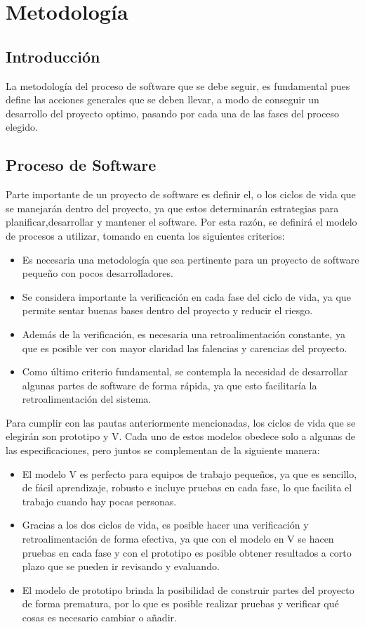 \chapter{Metodología}
\section{Introducción}
La metodología del proceso de software que se debe seguir, es fundamental pues define las acciones generales que se deben llevar, a modo de conseguir un desarrollo del proyecto optimo, pasando por cada una de las fases del proceso elegido.
\newpage

\section{Proceso de Software}
Parte importante de un proyecto de software es definir el, o los ciclos de vida que se manejarán dentro del proyecto, ya que estos determinarán estrategias para planificar,desarrollar y mantener el software. Por esta razón, se definirá el modelo de procesos a utilizar, tomando en cuenta los siguientes criterios:
\begin{itemize}
	\item Es necesaria una metodología que sea pertinente para un proyecto de software pequeño con pocos desarrolladores.
	\item Se considera importante la verificación en cada fase del ciclo de vida, ya que permite sentar buenas bases dentro del proyecto y reducir el riesgo.
	\item Además de la verificación, es necesaria una retroalimentación constante, ya que es posible ver con mayor claridad las falencias y carencias del proyecto.
	\item Como último criterio fundamental, se contempla la necesidad de desarrollar algunas partes de software de forma rápida, ya que esto facilitaría la retroalimentación del sistema.
\end{itemize}
Para cumplir con las pautas anteriormente mencionadas, los ciclos de vida que se elegirán son prototipo y V. Cada uno de estos modelos obedece solo a algunas de las especificaciones, pero juntos se complementan de la siguiente manera:
\begin{itemize}
	\item El modelo V es perfecto para equipos de trabajo pequeños, ya que es sencillo, de fácil aprendizaje, robusto e incluye pruebas en cada fase, lo que facilita el trabajo cuando hay pocas personas. 
	\item Gracias a los dos ciclos de vida, es posible hacer una verificación y retroalimentación de forma efectiva, ya que con el modelo en V se hacen pruebas en cada fase y con el prototipo es posible obtener resultados a corto plazo que se pueden ir revisando y evaluando.
	\item El modelo de prototipo brinda la posibilidad de construir partes del proyecto de forma prematura, por lo que es posible realizar pruebas y verificar qué cosas es necesario cambiar o añadir.
\end{itemize}
